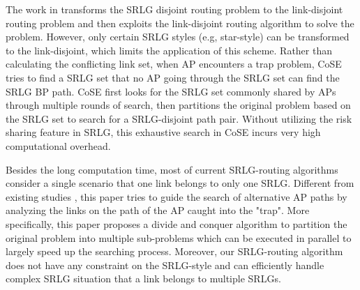 The work in \cite{datta2008graph} transforms the SRLG disjoint routing problem to the link-disjoint routing problem and then exploits the link-disjoint routing algorithm to solve the problem. However, only certain SRLG styles (e.g, star-style) can be transformed to the link-disjoint, which limits the application of this scheme. Rather than calculating the conflicting link set, when AP encounters a trap problem, CoSE \cite{rostami2007cose} tries to find a SRLG set that no AP going through the SRLG set can find the SRLG BP path. CoSE first looks for the SRLG set commonly shared by APs through multiple rounds of search, then  partitions the original problem based on the SRLG set to search for a SRLG-disjoint path pair.  Without utilizing the risk sharing feature in SRLG, this exhaustive search in CoSE incurs very high computational overhead.





Besides the long computation time, most of current SRLG-routing algorithms consider a single scenario that one link belongs to only one SRLG. Different from existing studies \cite{rostami2007cose,datta2008graph}, this paper tries to guide the search of alternative AP paths by analyzing the links on the path of the AP caught into the "trap". More specifically, this paper proposes a divide and conquer algorithm to partition the original problem into multiple sub-problems which can be executed in parallel to largely speed up the searching process. Moreover, our SRLG-routing algorithm does not have any constraint on the SRLG-style and can efficiently handle complex SRLG situation that a link belongs to multiple SRLGs.
